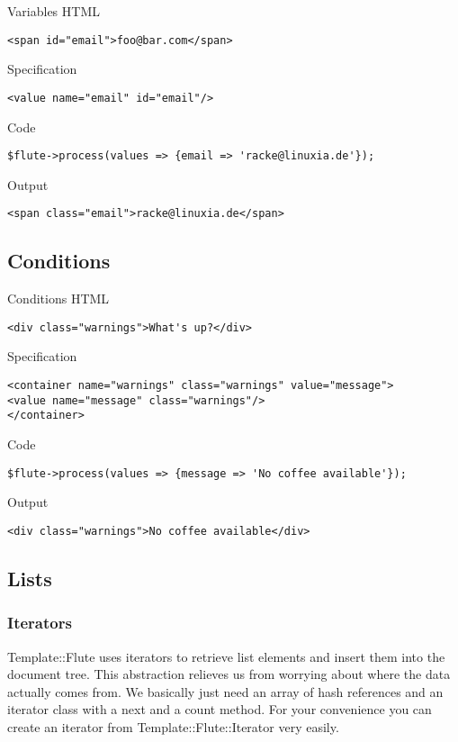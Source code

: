 \begin{frame}[fragile]{Variables}
HTML
\begin{lstlisting}
<span id="email">foo@bar.com</span>
\end{lstlisting}
Specification
\begin{lstlisting}
<value name="email" id="email"/>
\end{lstlisting}
Code
\begin{lstlisting}
$flute->process(values => {email => 'racke@linuxia.de'});
\end{lstlisting}
Output
\begin{lstlisting}
<span class="email">racke@linuxia.de</span>
\end{lstlisting}
\end{frame}

\subsection{Conditions}
\begin{frame}[fragile]{Conditions}
HTML
\begin{lstlisting}
<div class="warnings">What's up?</div>
\end{lstlisting}
Specification
\begin{lstlisting}
<container name="warnings" class="warnings" value="message">
<value name="message" class="warnings"/>
</container>
\end{lstlisting}
Code
\begin{lstlisting}
$flute->process(values => {message => 'No coffee available'});
\end{lstlisting}
Output
\begin{lstlisting}
<div class="warnings">No coffee available</div>
\end{lstlisting}
\end{frame}

\subsection{Lists}

\subsubsection{Iterators}
Template::Flute uses iterators to retrieve list elements and insert them into
the document tree. This abstraction relieves us from worrying about where
the data actually comes from. We basically just need an array of hash
references and an iterator class with a next and a count method. For your
convenience you can create an iterator from Template::Flute::Iterator
very easily.

